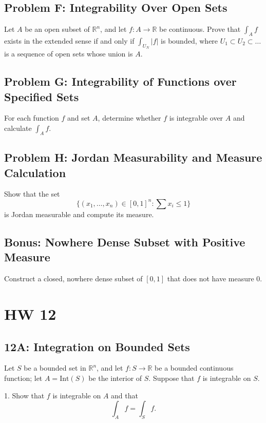 \documentclass[lang=cn,11pt]{template}
\begin{document}
\section*{Problem F: Integrability Over Open Sets}
Let \( A \) be an open subset of \( \mathbb{R}^n \), and let \( f : A \rightarrow \mathbb{R} \) be continuous. Prove that \( \int_A f \) exists in the extended sense if and only if \( \int_{U_N} |f| \) is bounded, where \( U_1 \subset U_2 \subset \dots \) is a sequence of open sets whose union is \( A \).

\section*{Problem G: Integrability of Functions over Specified Sets}
For each function \( f \) and set \( A \), determine whether \( f \) is integrable over \( A \) and calculate \( \int_A f \).

\section*{Problem H: Jordan Measurability and Measure Calculation}
Show that the set 
\[
\{ (x_1, \dots, x_n) \in [0, 1]^n : \sum x_i \leq 1 \}
\]
is Jordan measurable and compute its measure.

\section*{Bonus: Nowhere Dense Subset with Positive Measure}
Construct a closed, nowhere dense subset of \([0,1]\) that does not have measure 0.








\chapter*{HW 12}

\section*{12A: Integration on Bounded Sets}
Let \( S \) be a bounded set in \( \mathbb{R}^n \), and let \( f : S \rightarrow \mathbb{R} \) be a bounded continuous function; let \( A = \text{Int}(S) \) be the interior of \( S \). Suppose that \( f \) is integrable on \( S \).

1. Show that \( f \) is integrable on \( A \) and that
   \[
   \int_A f = \int_S f.
   \]
\end{document}
